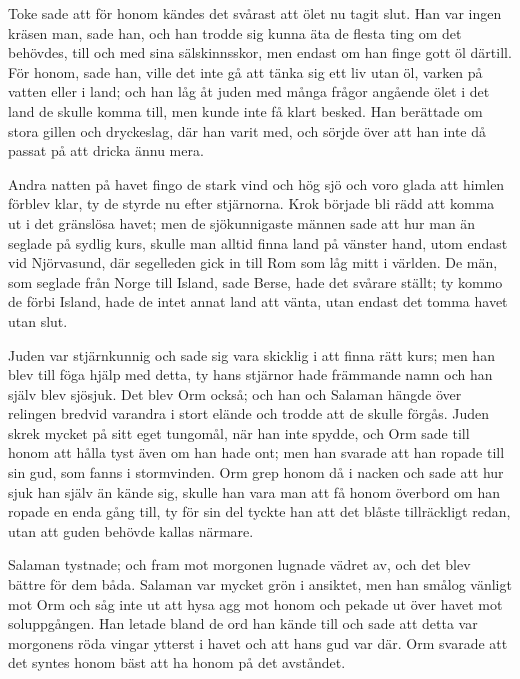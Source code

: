 \initial Toke sade att för honom kändes det svårast att ölet nu tagit slut. Han var ingen kräsen man, sade han, och han trodde sig kunna äta de flesta ting om det behövdes, till och med sina sälskinnsskor, men endast om han finge gott öl därtill. För honom, sade han, ville det inte gå att tänka sig ett liv utan öl, varken på vatten eller i land; och han låg åt juden med många frågor angående ölet i det land de skulle komma till, men kunde inte få klart besked. Han berättade om stora gillen och dryckeslag, där han varit med, och sörjde över att han inte då passat på att dricka ännu mera.

\initial Andra natten på havet fingo de stark vind och hög sjö och voro glada att himlen förblev klar, ty de styrde nu efter stjärnorna. Krok började bli rädd att komma ut i det gränslösa havet; men de sjökunnigaste männen sade att hur man än seglade på sydlig kurs, skulle man alltid finna land på vänster hand, utom endast vid Njörvasund, där segelleden gick in till Rom som låg mitt i världen. De män, som seglade från Norge till Island, sade Berse, hade det svårare ställt; ty kommo de förbi Island, hade de intet annat land att vänta, utan endast det tomma havet utan slut.

\initial Juden var stjärnkunnig och sade sig vara skicklig i att finna rätt kurs; men han blev till föga hjälp med detta, ty hans stjärnor hade främmande namn och han själv blev sjösjuk. Det blev Orm också; och han och Salaman hängde över relingen bredvid varandra i stort elände och trodde att de skulle förgås. Juden skrek mycket på sitt eget tungomål, när han inte spydde, och Orm sade till honom att hålla tyst även om han hade ont; men han svarade att han ropade till sin gud, som fanns i stormvinden. Orm grep honom då i nacken och sade att hur sjuk han själv än kände sig, skulle han vara man att få honom överbord om han ropade en enda gång till, ty för sin del tyckte han att det blåste tillräckligt redan, utan att guden behövde kallas närmare.

\initial Salaman tystnade; och fram mot morgonen lugnade vädret av, och det blev bättre för dem båda. Salaman var mycket grön i ansiktet, men han smålog vänligt mot Orm och såg inte ut att hysa agg mot honom och pekade ut över havet mot soluppgången. Han letade bland de ord han kände till och sade att detta var morgonens röda vingar ytterst i havet och att hans gud var där. Orm svarade att det syntes honom bäst att ha honom på det avståndet.


